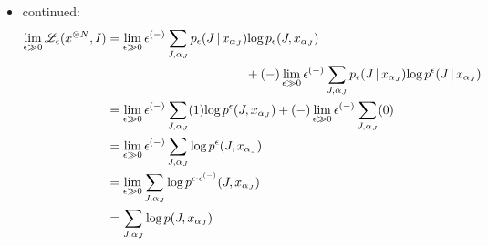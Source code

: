 \begin{frame} [t]
\begin{itemize}
    \item continued:
      { \footnotesize 
      \begin{align*}
          \lim _{\epsilon \gg 0}
            \like {\epsilon} 
             (x ^{\otimes N}, I) 
        & = 
            \lim _{\epsilon \gg 0}
            \epsilon ^{(-)}
            \sum _{J, \alpha _{J}} 
              p _{\epsilon}
                \conditional {J} 
                 {x _{\alpha _{J}}}
            \varlog p _{\epsilon} 
                   (J, x _{\alpha _{J}})
        \\ & \mkern200mu +
            (-)
            \lim _{\epsilon \gg 0}
            \epsilon ^{(-)}
            \sum _{J, \alpha _{J}} 
              p _{\epsilon}
                \conditional {J} 
                 {x _{\alpha _{J}}}
            \varlog  
                p ^{\epsilon} 
                \conditional 
                 {J} {x _{\alpha _{J}}} 
        \\ & = 
            \lim _{\epsilon \gg 0}
            \epsilon ^{(-)}
            \sum _{J, \alpha _{J}} 
              (1)  
            \varlog  
                p ^{\epsilon} 
                  (J, x _{\alpha _{J}})
        +
            (-) 
            \lim _{\epsilon \gg 0}
            \epsilon ^{(-)}
            \sum _{J, \alpha _{J}} 
              (0) 
        \\ & = 
            \lim _{\epsilon \gg 0}
            \epsilon ^{(-)}
            \sum _{J, \alpha _{J}}  
            \varlog  
                p ^{\epsilon} 
                  (J, x _{\alpha _{J}})
        \\ & = 
            \lim _{\epsilon \gg 0}
            \sum _{J, \alpha _{J}}  
            \varlog  
                p ^{ \epsilon \cdot 
                     \epsilon ^{(-)}
                   } 
                (J, x _{\alpha _{J}})
        \\ & = 
            \sum _{J, \alpha _{J}}  
            \varlog  
                p (J, x _{\alpha _{J}})
      \end{align*}  
      }
\end{itemize}
\end{frame}


